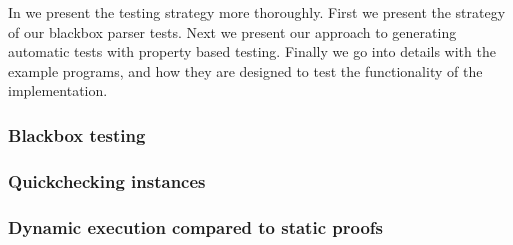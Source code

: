 In  we present the testing strategy more thoroughly.
First we present the strategy of our blackbox parser tests.
Next we present our approach to generating automatic tests with property based testing. 
Finally we go into details with the example programs, and how they are designed to test the functionality of the implementation.

\subsubsection{Blackbox testing}\label{sec:blackbox}


\subsubsection{Quickchecking instances}\label{sec:qc}


\subsubsection{Dynamic execution compared to static proofs}\label{sec:examples}


